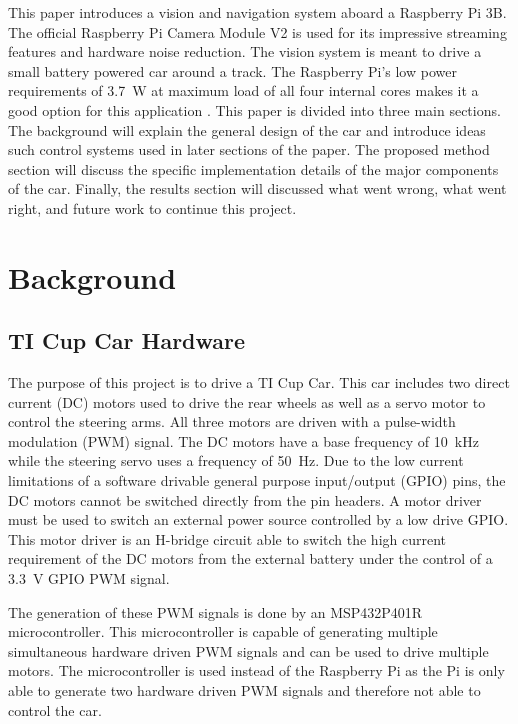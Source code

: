 \documentclass{article}
\begin{document}
This paper introduces a vision and navigation system aboard a Raspberry Pi 3B. The official Raspberry Pi Camera Module V2 is used for its impressive streaming features and hardware noise reduction. The vision system is meant to drive a small battery powered car around a track. The Raspberry Pi's low power requirements of \SI{3.7}{\watt} at maximum load of all four internal cores makes it a good option for this application \cite{b2}. This paper is divided into three main sections. The background will explain the general design of the car and introduce ideas such control systems used in later sections of the paper. The proposed method section will discuss the specific implementation details of the major components of the car. Finally, the results section will discussed what went wrong, what went right, and future work to continue this project.

\section{Background}

\subsection{TI Cup Car Hardware}

The purpose of this project is to drive a TI Cup Car. This car includes two direct current (DC) motors used to drive the rear wheels as well as a servo motor to control the steering arms. All three motors are driven with a pulse-width modulation (PWM) signal. The DC motors have a base frequency of \SI{10}{\kilo\hertz} while the steering servo uses a frequency of \SI{50}{\hertz}. Due to the low current limitations of a software drivable general purpose input/output (GPIO) pins, the DC motors cannot be switched directly from the pin headers. A motor driver must be used to switch an external power source controlled by a low drive GPIO. This motor driver is an H-bridge circuit able to switch the high current requirement of the DC motors from the external battery under the control of a \SI{3.3}{\volt} GPIO PWM signal.

The generation of these PWM signals is done by an MSP432P401R microcontroller. This microcontroller is capable of generating multiple simultaneous hardware driven PWM signals and can be used to drive multiple motors. The microcontroller is used instead of the Raspberry Pi as the Pi is only able to generate two hardware driven PWM signals and therefore not able to control the car.
\end{document}
